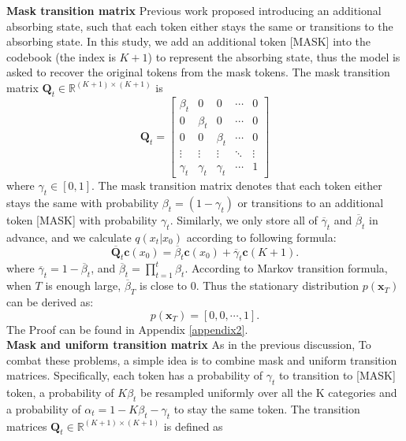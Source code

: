 \documentclass[lettersize,journal]{IEEEtran}
\begin{document}
\noindent\textbf{Mask transition matrix} Previous work \cite{hoogeboom2021argmax,gu2021vector} proposed introducing an additional absorbing state, such that each token either stays the same or transitions to the absorbing state. In this study, we add an additional token [MASK] into the codebook (the index is $K+1$) to represent the absorbing state, thus the model is asked to recover the original tokens from the mask tokens. The mask transition matrix $\boldsymbol{Q}_t \in \mathbb{R}^{(K+1) \times (K+1)}$ is
\begin{equation} \label{masked transition mat}
 \boldsymbol{Q}_t =
 \begin{bmatrix}
    \beta_t  & 0 & 0 & \cdots & 0 \\
    0 &  \beta_t & 0  & \cdots & 0  \\
    0 & 0 & \beta_t  & \cdots  & 0  \\
    \vdots  &   \vdots     &  \vdots      &  \ddots  &    \vdots \\
    \gamma_t & \gamma_t & \gamma_t   &  \cdots & 1
\end{bmatrix}
\end{equation}
\noindent where $\gamma_t \in [0,1]$. The mask transition matrix denotes that each token either stays the same with probability $\beta_t =(1-\gamma_t)$ or transitions to an additional token [MASK] with probability $\gamma_t$. Similarly, we only store all of $\overline{\gamma}_t$ and $\overline{\beta}_t$ in advance, and we calculate $q(x_t|x_0)$ according to following formula:
\begin{equation}\label{formula:quick cal mask matrix}
   \overline{\boldsymbol{Q}}_t \boldsymbol{c}(x_0) = \overline{\beta}_t \boldsymbol{c}(x_0) + \overline{\gamma}_t \boldsymbol{c}(K+1) .
\end{equation}
where $\overline{\gamma}_t= 1- \overline{\beta}_t$, and $\overline{\beta}_t=\prod_{t=1}^{t} \beta_t$.
According to Markov transition formula, when $T$ is enough large, $\overline{\beta}_T$ is close to 0. Thus the stationary distribution $p(\boldsymbol{x}_T)$ can be derived as:
\begin{equation}\label{formula:masked transition matrices}
  p(\boldsymbol{x}_T)=[0, 0 , \cdots, 1].
\end{equation}
The Proof can be found in Appendix \ref{appendix2}. \\
\textbf{Mask and uniform transition matrix} As in the previous discussion, {\color{black}{we speculate that using the uniform transition matrix brings the reverse process is hard to learn. Using the mask transition matrix may make the model tend to focus on the mask token and ignore the context information.}} To combat these problems, a simple idea is to combine mask and uniform transition matrices. Specifically, each token has a probability of $\gamma_t$ to transition to [MASK] token, a probability of $K\beta_t$ be resampled uniformly over all the K categories and a probability of $\alpha_t =  1-K\beta_t-\gamma_t$ to stay the same token. The transition matrices $\boldsymbol{Q}_t \in \mathbb{R}^{(K+1) \times (K+1)}$ is defined as
\end{document}

